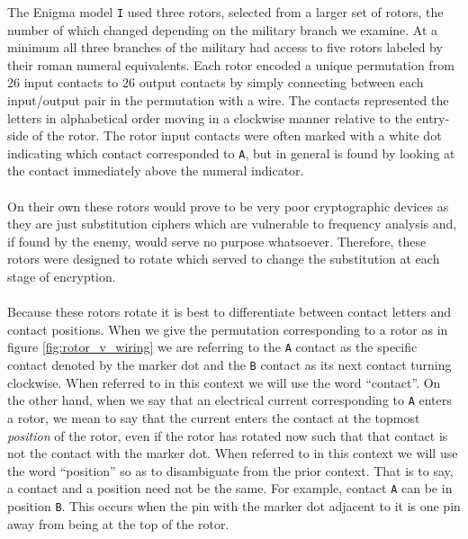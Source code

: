 The Enigma model \texttt{I} used three rotors, selected from a larger
set of rotors, the number of which changed depending on the military
branch we examine. At a minimum all three branches of the military
had access to five rotors labeled by their roman numeral equivalents.
Each rotor encoded a unique permutation from 26 input contacts to 26
output contacts by simply connecting between each input/output pair
in the permutation with a wire. The contacts represented the letters
in alphabetical order moving in a clockwise manner relative to the
entry-side of the rotor. The rotor input contacts were often marked
with a white dot indicating which contact corresponded to \texttt{A},
but in general is found by looking at the contact immediately above
the numeral indicator.
\\\\On their own these rotors would prove to be very poor
cryptographic devices as they are just substitution ciphers which are
vulnerable to frequency analysis and, if found by the enemy, would
serve no purpose whatsoever. Therefore, these rotors were designed to
rotate which served to change the substitution at each stage of encryption.
\\\\Because these rotors rotate it is best to differentiate between
contact letters and contact positions. When we give the permutation
corresponding to a rotor as in figure \ref{fig:rotor_v_wiring} we are
referring to the \texttt{A} contact as the specific contact denoted
by the marker dot and the \texttt{B} contact as its next contact
turning clockwise. When referred to in this context we will use the
word ``contact''. On the other hand, when we say that an electrical
current corresponding to \texttt{A} enters a rotor, we mean to say
that the current enters the contact at the topmost \emph{position} of
the rotor, even if the rotor has rotated now such that that contact
is not the contact with the marker dot. When referred to in this
context we will use the word ``position'' so as to disambiguate from
the prior context. That is to say, a contact and a position need not
be the same. For example, contact \texttt{A} can be in position
\texttt{B}. This occurs when the pin with the marker dot adjacent to
it is one pin away from being at the top of the rotor.

